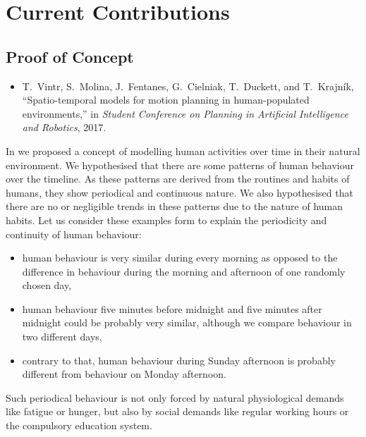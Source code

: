 \section{Current Contributions}

\subsection{Proof of Concept}

\begin{itemize}
    \item T.~Vintr, S.~Molina, J.~Fentanes, G.~Cielniak, T.~Duckett, and T.~Krajn{\'i}k, ``Spatio-temporal models for motion planning in human-populated environments,'' in \emph{Student Conference on Planning in Artificial Intelligence and Robotics}, 2017.
\end{itemize}

In \cite{vintr2017spatiotemporal} we proposed a concept of modelling human activities over time in their natural environment.
We hypothesised that there are some patterns of human behaviour over the timeline.
As these patterns are derived from the routines and habits of humans, they show periodical and continuous nature.
We also hypothesised that there are no or negligible trends in these patterns due to the nature of human habits. 
Let us consider these examples form \cite{Vintr2018Spatiotemporal} to explain the periodicity and continuity of human behaviour:

\begin{itemize}
    \item human  behaviour is very similar during every morning as opposed to the difference in behaviour during the morning and afternoon of one randomly chosen day,
    \item human behaviour five minutes before midnight and five minutes after midnight could be probably very similar, although we compare behaviour in two different days,
    \item contrary to that, human behaviour during Sunday afternoon is probably different from behaviour on Monday afternoon.
\end{itemize}

Such periodical behaviour is not only forced by natural physiological demands like fatigue or hunger, but also by social demands like regular working hours or the compulsory education system. 

